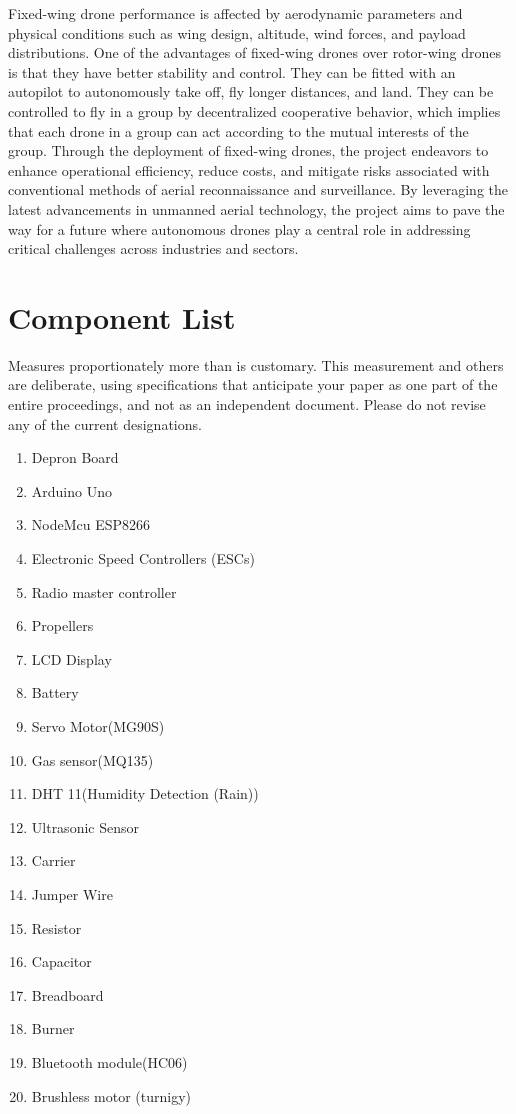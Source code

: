 \documentclass[conference]{IEEEtran}
\begin{document}
Fixed-wing drone performance is affected by aerodynamic parameters and physical conditions such as wing design, altitude, wind forces, and payload distributions. One of the advantages of fixed-wing drones over rotor-wing drones is that they have better stability and control. They can be fitted with an autopilot to autonomously take off, fly longer distances, and land. They can be controlled to fly in a group by decentralized cooperative behavior, which implies that each drone in a group can act according to the mutual interests of the group. Through the deployment of fixed-wing drones, the project endeavors to enhance operational efficiency, reduce costs, and mitigate risks associated with conventional methods of aerial reconnaissance and surveillance\cite{cuniettiurban}. By leveraging the latest advancements in unmanned aerial technology, the project aims to pave the way for a future where autonomous drones play a central role in addressing critical challenges across industries and sectors.

\section{Component List}

Measures proportionately more than is customary. This measurement and others are deliberate, using specifications that anticipate your paper as one part of the entire proceedings, and not as an independent document. Please do not revise any of the current designations.

\begin{enumerate}
    \item Depron Board
    \item Arduino Uno
    \item NodeMcu ESP8266
    \item Electronic Speed Controllers (ESCs)
    \item Radio master controller
    \item Propellers
    \item LCD Display
    \item Battery
    \item Servo Motor(MG90S)
    \item Gas sensor(MQ135)
    \item DHT 11(Humidity Detection (Rain))
    \item Ultrasonic Sensor
    \item Carrier
    \item Jumper Wire
    \item Resistor
    \item Capacitor
    \item Breadboard
    \item Burner 
    \item Bluetooth module(HC06)
    \item Brushless motor (turnigy)
\end{enumerate}
\end{document}
